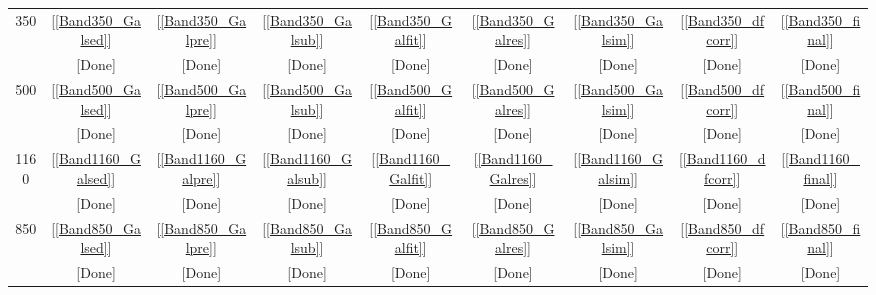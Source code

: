\documentclass[11pt,a4paper]{article}
\begin{document}
\begin{table}[h]
\begin{tabular}{ccccccccc}
		350 & [\ref{Band350_Galsed}] & [\ref{Band350_Galpre}] & [\ref{Band350_Galsub}] & [\ref{Band350_Galfit}] & [\ref{Band350_Galres}] & [\ref{Band350_Galsim}] & [\ref{Band350_dfcorr}] & [\ref{Band350_final}] \\
		& \textcolor{green!50!black}{[Done]} & \textcolor{green!50!black}{[Done]} & \textcolor{green!50!black}{[Done]} & \textcolor{green!50!black}{[Done]} & \textcolor{green!50!black}{[Done]} & \textcolor{green!50!black}{[Done]} & \textcolor{green!50!black}{[Done]} & \textcolor{green!50!black}{[Done]} \\
		500 & [\ref{Band500_Galsed}] & [\ref{Band500_Galpre}] & [\ref{Band500_Galsub}] & [\ref{Band500_Galfit}] & [\ref{Band500_Galres}] & [\ref{Band500_Galsim}] & [\ref{Band500_dfcorr}] & [\ref{Band500_final}] \\
		& \textcolor{green!50!black}{[Done]} & \textcolor{green!50!black}{[Done]} & \textcolor{green!50!black}{[Done]} & \textcolor{green!50!black}{[Done]} & \textcolor{green!50!black}{[Done]} & \textcolor{green!50!black}{[Done]} & \textcolor{green!50!black}{[Done]} & \textcolor{green!50!black}{[Done]} \\
		1160 & [\ref{Band1160_Galsed}] & [\ref{Band1160_Galpre}] & [\ref{Band1160_Galsub}] & [\ref{Band1160_Galfit}] & [\ref{Band1160_Galres}] & [\ref{Band1160_Galsim}] & [\ref{Band1160_dfcorr}] & [\ref{Band1160_final}] \\
		& \textcolor{green!50!black}{[Done]} & \textcolor{green!50!black}{[Done]} & \textcolor{green!50!black}{[Done]} & \textcolor{green!50!black}{[Done]} & \textcolor{green!50!black}{[Done]} & \textcolor{green!50!black}{[Done]} & \textcolor{green!50!black}{[Done]} & \textcolor{green!50!black}{[Done]} \\
		\hline
		850 & [\ref{Band850_Galsed}] & [\ref{Band850_Galpre}] & [\ref{Band850_Galsub}] & [\ref{Band850_Galfit}] & [\ref{Band850_Galres}] & [\ref{Band850_Galsim}] & [\ref{Band850_dfcorr}] & [\ref{Band850_final}] \\
		& \textcolor{green!50!black}{[Done]} & \textcolor{green!50!black}{[Done]} & \textcolor{green!50!black}{[Done]} & \textcolor{green!50!black}{[Done]} & \textcolor{green!50!black}{[Done]} & \textcolor{green!50!black}{[Done]} & \textcolor{green!50!black}{[Done]} & \textcolor{green!50!black}{[Done]} \\
		\hline
	\end{tabular}
\end{table}

\end{document}
